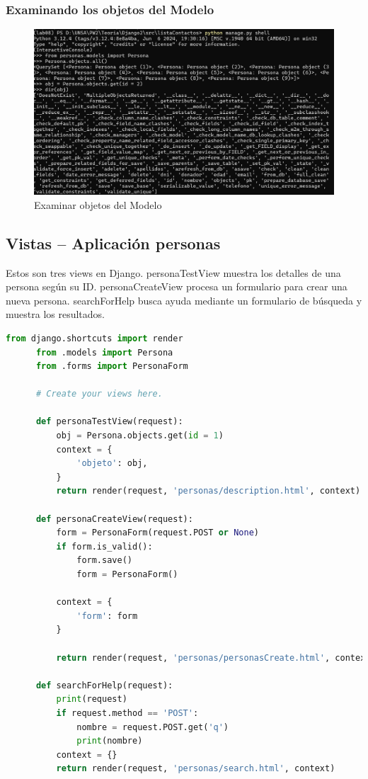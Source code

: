 \documentclass{article}
\begin{document}
  
  \subsubsection{Examinando los objetos del Modelo}
    \begin{figure}[H]
      \centering
      \includegraphics[width=1\textwidth, keepaspectratio]{img/examinar.png}
      \caption{Examinar objetos del Modelo}
    \end{figure}
    

  \subsection{Vistas -- Aplicación personas}
    Estos son tres views en Django. personaTestView muestra los detalles de una persona según su ID. personaCreateView procesa 
    un formulario para crear una nueva persona. searchForHelp busca ayuda mediante un formulario de búsqueda y muestra los resultados.
    \begin{lstlisting}[language=python]
      from django.shortcuts import render
      from .models import Persona
      from .forms import PersonaForm

      # Create your views here.

      def personaTestView(request):
          obj = Persona.objects.get(id = 1)
          context = {
              'objeto': obj,
          }
          return render(request, 'personas/description.html', context)

      def personaCreateView(request):
          form = PersonaForm(request.POST or None)
          if form.is_valid():
              form.save()
              form = PersonaForm()
              
          context = {
              'form': form
          }
          
          return render(request, 'personas/personasCreate.html', context)
          
      def searchForHelp(request):
          print(request)
          if request.method == 'POST':
              nombre = request.POST.get('q')
              print(nombre)
          context = {}
          return render(request, 'personas/search.html', context)
    \end{lstlisting}
\end{document}
